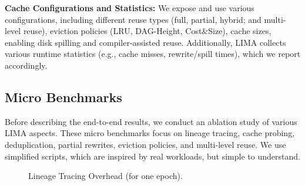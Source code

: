 \textbf{Cache Configurations and Statistics:} We expose and use various configurations, including different reuse types (full, partial, hybrid; and multi-level reuse), eviction policies (LRU, DAG-Height, Cost\&Size), cache sizes, enabling disk spilling and compiler-assisted reuse. Additionally, LIMA collects various runtime statistics (e.g., cache misses, rewrite/spill times), which we report accordingly.

\subsection{Micro Benchmarks}
\label{sec:micro}

Before describing the end-to-end results, we conduct an ablation study of various LIMA aspects. These micro benchmarks focus on lineage tracing, cache probing, deduplication, partial rewrites, eviction policies, and multi-level reuse. We use simplified scripts, which are inspired by real workloads, but simple to understand.

\begin{figure}[!t]
	\centering
	\hfill	
	\vspace{-0.45cm}
	\caption{\label{fig:overhead}Lineage Tracing Overhead (for one epoch).}
\end{figure}

